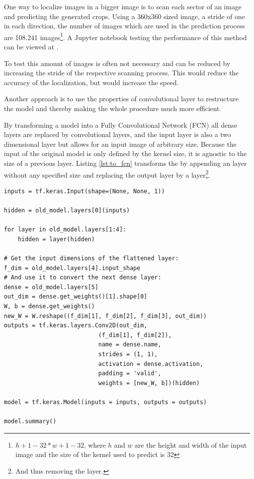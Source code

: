 One way to localize images in a bigger image is to scan each sector of an image and predicting the generated crops.
Using a 360x360 sized image, a stride of one in each direction, the number of images which are used in the prediction process are 108.241 images\footnote{$h + 1 - 32 * w + 1 - 32$, where $h$ and $w$ are the height and width of the input image and the size of the kernel used to predict is 32}.
A Jupyter notebook testing the performance of this method can be viewed at .

To test this amount of images is often not necessary and can be reduced by increasing the stride of the respective scanning process.
This would reduce the accuracy of the localization, but would increase the speed.

Another approach is to use the properties of convolutional layer to restructure the model and thereby making the whole procedure much more efficient.

By transforming a model into a Fully Convolutional Network (FCN) all dense layers are replaced by convolutional layers, and the input layer is also a two dimensional layer but allows for an input image of arbitrary size.
Because the input of the original model is only defined by the kernel size, it is agnostic to the size of a previous layer.
Listing \ref{lst:to_fcn} transforms the  by appending an  layer without any specified size and replacing the output layer by a  layer\footnote{And thus removing the  layer.}.

\begin{lstlisting}[caption={Transformation of the Symbol Classifier into a FCN.}, label=lst:to_fcn]
inputs = tf.keras.Input(shape=(None, None, 1))

hidden = old_model.layers[0](inputs)

for layer in old_model.layers[1:4]:
    hidden = layer(hidden)

# Get the input dimensions of the flattened layer:
f_dim = old_model.layers[4].input_shape
# And use it to convert the next dense layer:
dense = old_model.layers[5]
out_dim = dense.get_weights()[1].shape[0]
W, b = dense.get_weights()
new_W = W.reshape((f_dim[1], f_dim[2], f_dim[3], out_dim))
outputs = tf.keras.layers.Conv2D(out_dim,
                           (f_dim[1], f_dim[2]),
                           name = dense.name,
                           strides = (1, 1),
                           activation = dense.activation,
                           padding = 'valid',
                           weights = [new_W, b])(hidden)

model = tf.keras.Model(inputs = inputs, outputs = outputs)

model.summary()
\end{lstlisting}

